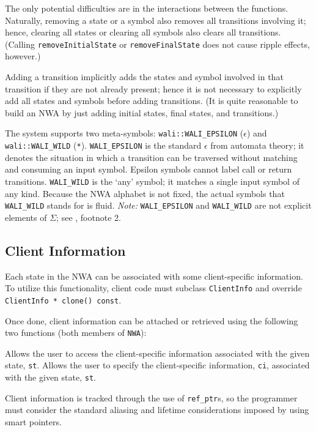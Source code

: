 The only potential difficulties are in the interactions between the
functions. Naturally, removing a state or a symbol also removes all
transitions involving it; hence, clearing all states or clearing all symbols
also clears all transitions. (Calling \texttt{removeInitialState} or \texttt{removeFinalState}
does not cause ripple effects, however.)

Adding a transition implicitly adds the states and symbol involved in that
transition if they are not already present; hence it is not necessary to
explicitly add all states and symbols before adding transitions. (It is quite
reasonable to build an NWA by just adding initial states, final states, and
transitions.)


The system supports two meta-symbols: \texttt{wali::WALI\_EPSILON}
(\texttt{$\epsilon$}) and \texttt{wali::WALI\_WILD} (\texttt{*}).
\texttt{WALI\_EPSILON} is the standard $\epsilon$ from automata theory; it
denotes the situation in which a transition can be traversed without matching
and consuming an input symbol.  Epsilon symbols cannot label call or return
transitions. \texttt{WALI\_WILD} is the `any' symbol; it matches a single input
symbol of any kind.  Because the NWA alphabet is not fixed, the actual symbols
that \texttt{WALI\_WILD} stands for is fluid.  \textsl{Note:}
\texttt{WALI\_EPSILON} and \texttt{WALI\_WILD} are not explicit
elements of $\Sigma$; see , footnote 2. 



\subsection{Client Information}
\label{Se:client-info}

Each state in the NWA can be associated with some client-specific
information. To utilize this functionality, client code must subclass
\texttt{ClientInfo} and override \texttt{ClientInfo * clone() const}.

Once done, client information can be attached or retrieved using the
following two functions (both members of \texttt{NWA}):
\begin{functionlist}
    Allows the user to access the client-specific information associated with
    the given state, \texttt{st}.
    Allows the user to specify the client-specific information, \texttt{ci},
    associated with the given state, \texttt{st}. \\
\end{functionlist}
Client information is tracked through the use of \texttt{ref\_ptr}s, so the
programmer must consider the standard aliasing and lifetime considerations
imposed by using smart pointers.

